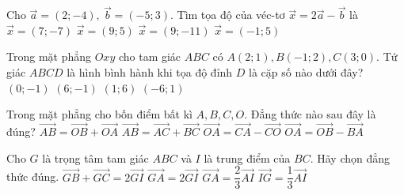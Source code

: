\begin{ex}%
Cho $\overrightarrow{a}=(2;-4),\ \overrightarrow{b}=(-5;3)$. Tìm tọa độ của véc-tơ $\overrightarrow{x}=2\overrightarrow{a}-\overrightarrow{b}$ là
\choice
{$\overrightarrow{x}=(7;-7)$}
{$\overrightarrow{x}=(9;5)$}
{\True $\overrightarrow{x}=(9;-11)$}
{$\overrightarrow{x}=(-1;5)$}
\end{ex}
\begin{ex}%
Trong mặt phẳng $Oxy$ cho tam giác $ABC$ có $A(2;1), B(-1;2), C(3;0)$. Tứ giác $ABCD$ là hình bình hành khi tọa độ đỉnh $D$ là cặp số nào dưới đây?
\choice
{$(0;-1)$}
{\True $(6;-1)$}
{$(1;6)$}
{$(-6;1)$}
\end{ex}
\begin{ex}%
Trong mặt phẳng cho bốn điểm bất kì $A,B,C,O$. Đẳng thức nào sau đây là đúng?
\choice
{$\overrightarrow{AB}=\overrightarrow{OB}+\overrightarrow{OA}$}
{$\overrightarrow{AB}=\overrightarrow{AC}+\overrightarrow{BC}$}
{\True $\overrightarrow{OA}=\overrightarrow{CA}-\overrightarrow{CO}$}
{$\overrightarrow{OA}=\overrightarrow{OB}-\overrightarrow{BA}$}
\end{ex}
\begin{ex}%
Cho $G$ là trọng tâm tam giác $ABC$ và $I$ là trung điểm của $BC$. Hãy chọn đẳng thức đúng.
\choice
{\True $\overrightarrow{GB}+\overrightarrow{GC}=2\overrightarrow{GI}$}
{$\overrightarrow{GA}=2\overrightarrow{GI}$}
{$\overrightarrow{GA}=\dfrac{2}{3}\overrightarrow{AI}$}
{$\overrightarrow{IG}=\dfrac{1}{3}\overrightarrow{AI}$}
\end{ex}

